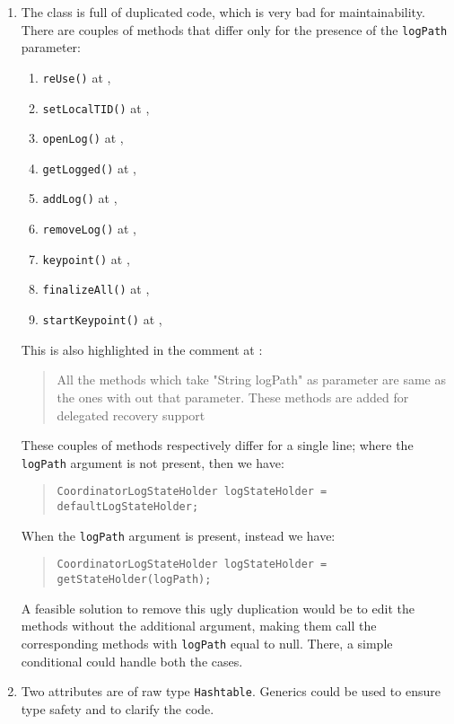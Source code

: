 \begin{enumerate}
    \item {} The class is full of duplicated code, which is very bad for maintainability. There are couples of methods that differ only for the presence of the \texttt{logPath} parameter:
    \begin{enumerate}
        \item \texttt{reUse()} at , 
    	\item \texttt{setLocalTID()} at , 
    	\item \texttt{openLog()} at , 
    	\item \texttt{getLogged()} at , 
    	\item \texttt{addLog()} at , 
    	\item \texttt{removeLog()} at , 
    	\item \texttt{keypoint()} at , 
    	\item \texttt{finalizeAll()} at , 
    	\item \texttt{startKeypoint()} at , 
    \end{enumerate}
    This is also highlighted in the comment at :
    \begin{quote}
        All the methods which take "String logPath" as parameter are same as the ones with out that parameter. These methods are added for delegated recovery support
    \end{quote}
    These couples of methods respectively differ for a single line; where the \texttt{logPath} argument is not present, then we have:
    \begin{quote}
        \small\texttt{CoordinatorLogStateHolder logStateHolder = defaultLogStateHolder;}
    \end{quote}
    When the \texttt{logPath} argument is present, instead we have:
    \begin{quote}
        \small\texttt{CoordinatorLogStateHolder logStateHolder = getStateHolder(logPath);}
    \end{quote}
    A feasible solution to remove this ugly duplication would be to edit the methods without the additional argument, making them call the corresponding methods with \texttt{logPath} equal to null. There, a simple conditional could handle both the cases.
    \item {} Two attributes are of raw type \texttt{Hashtable}. Generics could be used to ensure type safety and to clarify the code.

\end{enumerate}
